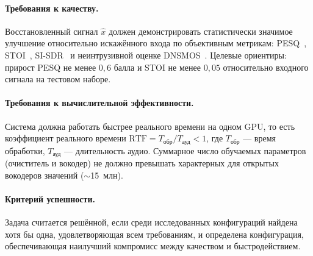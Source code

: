 \paragraph{Требования к качеству.} Восстановленный сигнал $\hat{x}$ должен
демонстрировать статистически значимое улучшение относительно искажённого входа
по объективным метрикам: PESQ~\cite{pesq}, STOI~\cite{stoi},
SI-SDR~\cite{sisdr} и неинтрузивной оценке DNSMOS~\cite{dnsmos}. Целевые
ориентиры: прирост PESQ не менее $0{,}6$ балла и STOI не менее $0{,}05$
относительно входного сигнала на тестовом наборе.

\paragraph{Требования к вычислительной эффективности.} Система должна работать
быстрее реального времени на одном GPU, то есть коэффициент реального времени
$\mathrm{RTF} = T_{\text{обр}} / T_{\text{ауд}} < 1$, где $T_{\text{обр}}$ ---
время обработки, $T_{\text{ауд}}$ --- длительность аудио. Суммарное число
обучаемых параметров (очиститель и вокодер) не должно превышать характерных для
открытых вокодеров значений ($\sim$15~млн).

\paragraph{Критерий успешности.} Задача считается решённой, если среди
исследованных конфигураций найдена хотя бы одна, удовлетворяющая всем
требованиям, и определена конфигурация, обеспечивающая наилучший компромисс
между качеством и быстродействием.
